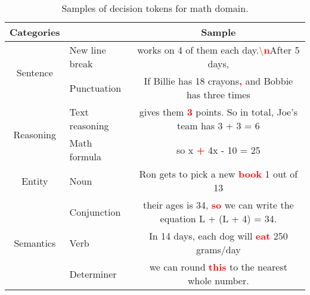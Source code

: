 \begin{table*}[htbp]
  \caption{Samples of decision tokens for math domain.}
    \noindent
    \begin{minipage}{\textwidth}
   \setlength{\abovecaptionskip}{7pt}
   \vspace{-0.05in}
   \setlength{\cmidrulewidth}{0.01em}
   \renewcommand{\tabcolsep}{10pt}
   \renewcommand{\arraystretch}{1.2}
   \centering
   \begin{tabular}{cl|c@{}}
   
   \toprule
        \multirow{1}{*}{Categories} & \hspace{2.0em}\multirow{1}{*}{Subtypes} & Sample\\
         \midrule
         \multirow{2}{*}{Sentence} &
         \vline\hspace{0.9em} New line break &  works on 4 of them each day.\textcolor{red}{\textbackslash \textbf{n}}After 5 days,\\
         & \vline\hspace{1.4em} Punctuation & If Billie has 18 crayons\textcolor{red}{\textbf{,}} and Bobbie has three times\\
         
         \multirow{2}{*}{Reasoning} & \hspace{0.8em} Text reasoning & gives them \textcolor{red}{\textbf{3}} points. So in total, Joe's team has 3 + 3 = 6\\
         
         & \hspace{1.0em} Math formula & so x \textcolor{red}{\textbf{+}} 4x - 10 = 25\\
         

         \multirow{1}{*}{Entity}& \hspace{2.7em} Noun & Ron gets to pick a new \textcolor{red}{\textbf{book}} 1 out of 13\\
         
         \multirow{3}{*}{Semantics}& \vline \hspace{1.4em} Conjunction & their ages is 34, \textcolor{red}{\textbf{so}} we can write the equation L + (L + 4) = 34.\\
         & \vline \hspace{2.8em} Verb & In 14 days, each dog will \textcolor{red}{\textbf{eat}} 250 grams/day\\
         & \vline \hspace{1.5em} Determiner & we can round \textcolor{red}{\textbf{this}} to the nearest whole number. \\
         
         \bottomrule
   \end{tabular}
   

  \label{tab:Math_confused_samples}
    \end{minipage}
\end{table*}

